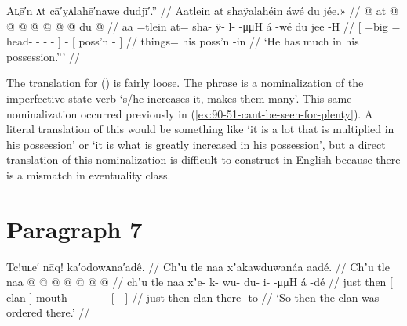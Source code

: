 \ex\label{ex:90-81-hes-got-a-lot}%
%
\begingl
	\glpreamble	Aʟ̣ē′n ᴀt cā′ỵᴀlahē′nawe dudjī′.” //
	\glpreamble	Aatlein at shaÿalahéin áwé du jée.\!» //
	\gla	{}  @ {} at @  @ {} @ {} @ {} @ {} @ {} {}
		 @ {}
		{} du  @ {} {} //
	\glb	{} aa =tlein at= sha- ÿ- l-  -μμH {} {}
		á -wé
		{} du jee -H {} //
	\glc	{}[  =big = head- - -  - \· {}]
		 -
		{}[  poss’n - {}] //
	\gld	{}  {} things=  {} {} {} {} {} {}
		 {}
		{} his poss’n -in {} //
	\glft	‘He has much in his possession.”’
		//
\endgl
\xe

The translation for (\lastx) is fairly loose.
The phrase  is a nominalization of the imperfective state verb  ‘s/he increases it, makes them many’.
This same nominalization occurred previously in (\ref{ex:90-51-cant-be-seen-for-plenty}).
A literal translation of this would be something like ‘it is a lot that is multiplied in his possession’ or ‘it is what is greatly increased in his possession’, but a direct translation of this nominalization is difficult to construct in English because there is a mismatch in eventuality class.

\section{Paragraph 7}\label{sec:90-para-7}

\ex\label{ex:90-82-clan-ordered-there}%
%
\begingl
	\glpreamble	Tc!uʟe′ nāq! ka′odowᴀna′adê. //
	\glpreamble	Chʼu tle naa x̱ʼakawduwanáa aadé. //
	\gla	Chʼu tle
		{} naa {}
		 @ {} @ {} @ {} @ {} @ {} @ {}
		{}  @ {} {} //
	\glb	chʼu tle
		{} naa {}
		x̱ʼe- k- wu- du- i-  -μμH
		{} á -dé {} //
	\glc	just then
		{}[ clan {}]
		mouth- - - - -  -
		{}[  - {}] //
	\gld	just then
		{} clan {}
		 {} {} {} {} {} {}
		{} there -to {} //
	\glft	‘So then the clan was ordered there.’
		//
\endgl
\xe

